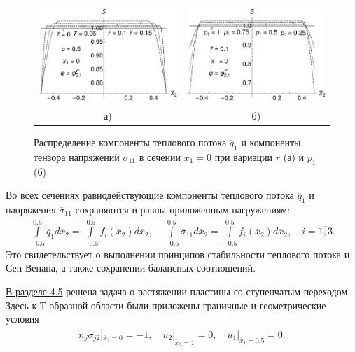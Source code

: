 \begin{figure}[ht] \centering
	\begin{tabular}{cc}
		\includegraphics[width=0.38\linewidth]{pics/HeatFluxStabilityVariationR.pdf} &
		\includegraphics[width=0.38\linewidth]{pics/HeatFluxStabilityVariationP1.pdf} \\
		а) & б)
	\end{tabular}
    \caption{Распределение компоненты теплового потока $\overline{q}_1$ и компоненты тензора напряжений $\overline{\sigma}_{11}$ в сечении $\overline{x}_1 = 0$ при вариации $\overline{r}$ (а) и $p_1$ (б)}
    \label{fig:SaintVenantVariation}
\end{figure}

Во всех сечениях равнодействующие компоненты теплового потока $\overline{q}_1$ и напряжения $\overline{\sigma}_{11}$ сохраняются и равны приложенным нагружениям:
\begin{gather*}
	\int\limits_{-0.5}^{0.5} \overline{q}_1 d\overline{x}_2 = 
	\int\limits_{-0.5}^{0.5} f_i (\overline{x}_2) d\overline{x}_2,
	\quad
	\int\limits_{-0.5}^{0.5} \overline{\sigma}_{11} d\overline{x}_2 = 
	\int\limits_{-0.5}^{0.5} f_i (\overline{x}_2) d\overline{x}_2,
	\quad	
	i = \overline{1,3}.
\end{gather*}
Это свидетельствует о выполнении принципов стабильности теплового потока и Сен-Венана, а также сохранении балансных соотношений.

\underline{В разделе 4.5} решена задача о растяжении пластины со ступенчатым переходом. Здесь к Т-образной области были приложены граничные и геометрические условия
\begin{gather*}
	n_j \overline{\sigma}_{j2} |_{\overline{x}_2 = 0} = -1,
	\quad
	\overline{u}_2 |_{\overline{x}_2 = 1} = 0,
	\quad
	\overline{u}_1 |_{\overline{x}_1 = 0.5} = 0.
\end{gather*}


